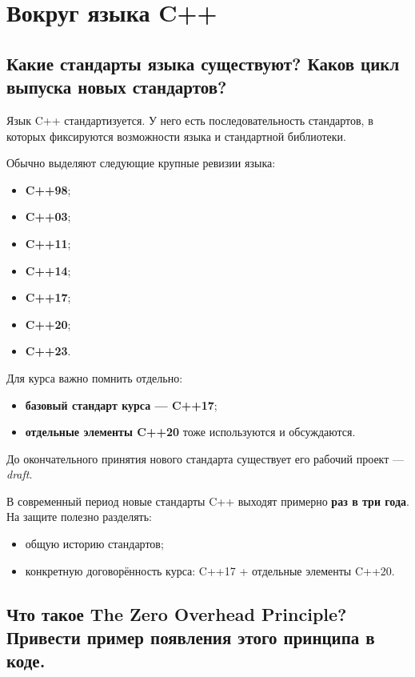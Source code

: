 \section{Вокруг языка C++}

\subsection{Какие стандарты языка существуют? Каков цикл выпуска новых стандартов?}

Язык C++ стандартизуется. У него есть последовательность стандартов, в которых фиксируются возможности языка и стандартной библиотеки.

\begin{definition}
Обычно выделяют следующие крупные ревизии языка:
\begin{itemize}
    \item \textbf{C++98};
    \item \textbf{C++03};
    \item \textbf{C++11};
    \item \textbf{C++14};
    \item \textbf{C++17};
    \item \textbf{C++20};
    \item \textbf{C++23}.
\end{itemize}
\end{definition}

Для курса важно помнить отдельно:
\begin{itemize}
    \item \textbf{базовый стандарт курса --- C++17};
    \item \textbf{отдельные элементы C++20} тоже используются и обсуждаются.
\end{itemize}

До окончательного принятия нового стандарта существует его рабочий проект --- \textit{draft}.

\begin{remark}
В современный период новые стандарты C++ выходят примерно \textbf{раз в три года}. На защите полезно разделять:
\begin{itemize}
    \item общую историю стандартов;
    \item конкретную договорённость курса: C++17 + отдельные элементы C++20.
\end{itemize}
\end{remark}


\subsection{Что такое The Zero Overhead Principle? Привести пример появления этого принципа в коде.}

